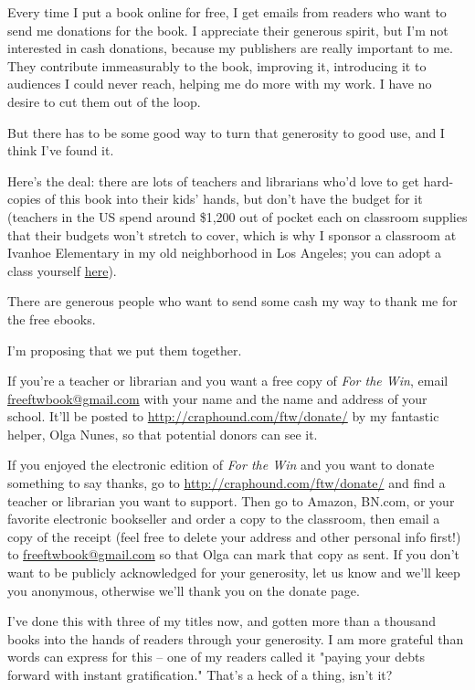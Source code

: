 Every time I put a book online for free, I get emails from readers
who want to send me donations for the book. I appreciate their
generous spirit, but I'm not interested in cash donations, because
my publishers are really important to me. They contribute
immeasurably to the book, improving it, introducing it to audiences
I could never reach, helping me do more with my work. I have no
desire to cut them out of the loop.

But there has to be some good way to turn that generosity to good
use, and I think I've found it.

Here's the deal: there are lots of teachers and librarians who'd
love to get hard-copies of this book into their kids' hands, but
don't have the budget for it (teachers in the US spend around
\$1,200 out of pocket each on classroom supplies that their budgets
won't stretch to cover, which is why I sponsor a classroom at
Ivanhoe Elementary in my old neighborhood in Los Angeles; you can
adopt a class yourself
\href{http://www.adoptaclassroom.org/}{here}).

There are generous people who want to send some cash my way to
thank me for the free ebooks.

I'm proposing that we put them together.

If you're a teacher or librarian and you want a free copy of
\emph{For the Win}, email
\href{mailto:freeftwbook@gmail.com}{freeftwbook@gmail.com} with
your name and the name and address of your school. It'll be posted
to
\href{http://craphound.com/ftw/donate/}{http://craphound.com/ftw/donate/}
by my fantastic helper, Olga Nunes, so that potential donors can
see it.

If you enjoyed the electronic edition of \emph{For the Win} and you
want to donate something to say thanks, go to
\href{http://craphound.com/ftw/donate/}{http://craphound.com/ftw/donate/}
and find a teacher or librarian you want to support. Then go to
Amazon, BN.com, or your favorite electronic bookseller and order a
copy to the classroom, then email a copy of the receipt (feel free
to delete your address and other personal info first!) to
\href{mailto:freeftwbook@gmail.com}{freeftwbook@gmail.com} so that
Olga can mark that copy as sent. If you don't want to be publicly
acknowledged for your generosity, let us know and we'll keep you
anonymous, otherwise we'll thank you on the donate page.

I've done this with three of my titles now, and gotten more than a
thousand books into the hands of readers through your generosity. I
am more grateful than words can express for this -- one of my
readers called it "paying your debts forward with instant
gratification." That's a heck of a thing, isn't it?

